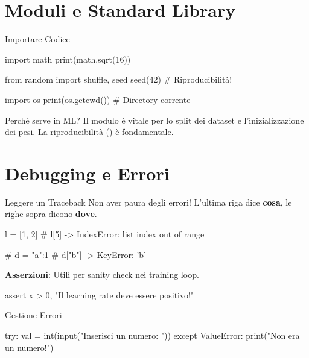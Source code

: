 \documentclass[12pt,aspectratio=169,notheorems]{beamer}
\begin{document}
\section{Moduli e Standard Library}

\begin{frame}[fragile]{Importare Codice}
    \begin{python}
        import math
        print(math.sqrt(16))

        from random import shuffle, seed
        seed(42) # Riproducibilità!

        import os
        print(os.getcwd()) # Directory corrente
    \end{python}
    \begin{mlblock}{Perché serve in ML?}
        Il modulo  è vitale per lo split dei dataset e l'inizializzazione dei pesi. La riproducibilità () è fondamentale.
    \end{mlblock}
\end{frame}

\section{Debugging e Errori}

\begin{frame}[fragile]{Leggere un Traceback}
    Non aver paura degli errori! L'ultima riga dice \textbf{cosa}, le righe sopra dicono \textbf{dove}.
    \begin{python}
        l = [1, 2]
        # l[5] -> IndexError: list index out of range

        # d = {"a":1}
        # d["b"] -> KeyError: 'b'
    \end{python}
    \textbf{Asserzioni}: Utili per sanity check nei training loop.
    \begin{python}
        assert x > 0, "Il learning rate deve essere positivo!"
    \end{python}
\end{frame}

\begin{frame}[fragile]{Gestione Errori}
    \begin{python}
        try:
            val = int(input("Inserisci un numero: "))
        except ValueError:
            print("Non era un numero!")
    \end{python}
\end{frame}
\end{document}
